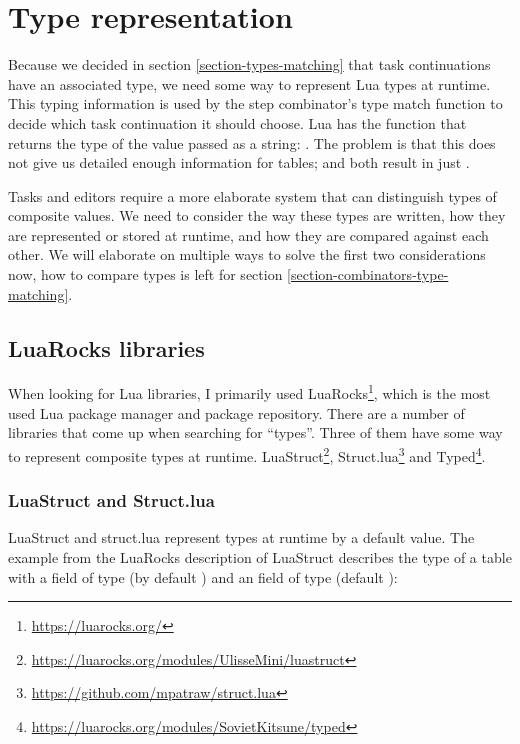 \section{Type representation}\label{section-type-representation}
Because we decided in section \ref{section-types-matching} that task continuations have an associated type, we need some way to represent Lua types at runtime. This typing information is used by the step combinator's type match function to decide which task continuation it should choose.
Lua has the  function that returns the type of the value passed as a string: . The problem is that this does not give us detailed enough information for tables;  and  both result in just .

Tasks and editors require a more elaborate system that can distinguish types of composite values. We need to consider the way these types are written, how they are represented or stored at runtime, and how they are compared against each other. We will elaborate on multiple ways to solve the first two considerations now, how to compare types is left for section \ref{section-combinators-type-matching}.

\subsection{LuaRocks libraries}\label{section-task-types-luarocks}
When looking for Lua libraries, I primarily used LuaRocks\footnote{\label{footnote-luarocks}\url{https://luarocks.org/}}, which is the most used Lua package manager and package repository. There are a number of libraries that come up when searching for ``types''. Three of them have some way to represent composite types at runtime.
LuaStruct\footnote{\label{footnote-luastruct}\url{https://luarocks.org/modules/UlisseMini/luastruct}},
Struct.lua\footnote{\url{https://github.com/mpatraw/struct.lua}} and
Typed\footnote{\label{footnote-typed}\url{https://luarocks.org/modules/SovietKitsune/typed}}.

\subsubsection{LuaStruct and Struct.lua}
LuaStruct and struct.lua represent types at runtime by a default value. The example from the LuaRocks description of LuaStruct describes the type of a table with a  field of type  (by default ) and an  field of type  (default ):

